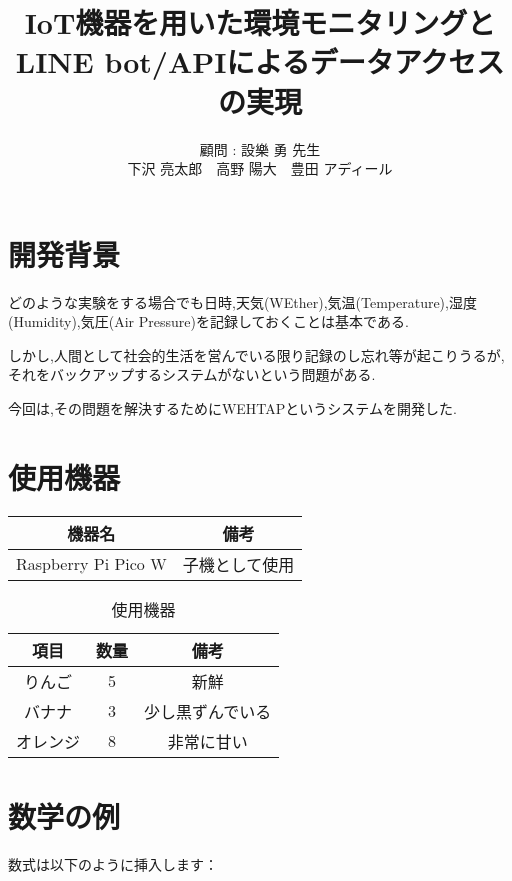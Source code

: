 \documentclass[a4paper,10pt,twocolumn]{article}
\title{IoT機器を用いた環境モニタリングと\\LINE bot/APIによるデータアクセスの実現}
\author{
顧問 : 設樂 勇 先生\\
下沢 亮太郎　高野 陽大　豊田 アディール
}
\date{}
\begin{document}
\maketitle


\section{開発背景}
どのような実験をする場合でも日時,天気(WEther),気温(Temperature),湿度(Humidity),気圧(Air Pressure)を記録しておくことは基本である.

しかし,人間として社会的生活を営んでいる限り記録のし忘れ等が起こりうるが,それをバックアップするシステムがないという問題がある.

今回は,その問題を解決するためにWEHTAPというシステムを開発した.

\section{使用機器}
\setlength{\tabcolsep}{12pt}
\renewcommand{\arraystretch}{1.5}

\begin{table}[h]
  \centering
  \begin{tabular}{|c|c|}
    \hline
    機器名 & 備考 \\
    \midrule
    Raspberry Pi Pico W & 子機として使用\\
  \end{tabular}
\end{table}

\begin{table}[h]
\centering
\begin{tabular}{|c|c|c|}
\hline
項目 & 数量 & 備考 \\
\hline
りんご & 5 & 新鮮 \\
バナナ & 3 & 少し黒ずんでいる \\
オレンジ & 8 & 非常に甘い \\
\hline
\end{tabular}
\caption{使用機器}
\label{tab:fruits}
\end{table}


\section{数学の例}
数式は以下のように挿入します：
\end{document}
